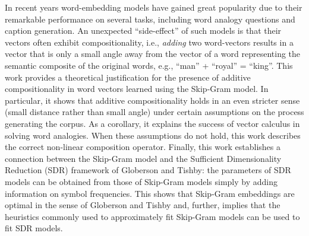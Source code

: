 In recent years word-embedding models have gained great popularity due to their remarkable performance on several tasks, including word analogy questions and caption generation. An unexpected ``side-effect'' of such models is that their vectors often exhibit compositionality, i.e., \emph{adding} two word-vectors results in a vector that is only a small angle away from the vector of a word representing the semantic composite of the original words, e.g., ``man'' + ``royal'' = ``king''. This work provides a theoretical justification for the presence of additive compositionality in word vectors learned using the Skip-Gram model. In particular, it shows that additive compositionality holds in an even stricter sense (small distance rather than small angle) under certain assumptions on the process generating the corpus. As a corollary, it explains the success of vector calculus in solving word analogies. When these assumptions do not hold, this work describes the correct non-linear composition operator. Finally, this work establishes a connection between the Skip-Gram model and the Sufficient Dimensionality Reduction (SDR) framework of Globerson and Tishby: the parameters of SDR models can be obtained from those of Skip-Gram models simply by adding information on symbol frequencies. This shows that Skip-Gram embeddings are optimal in the sense of Globerson and Tishby and, further, implies that the heuristics commonly used to approximately fit Skip-Gram models can be used to fit SDR models.
